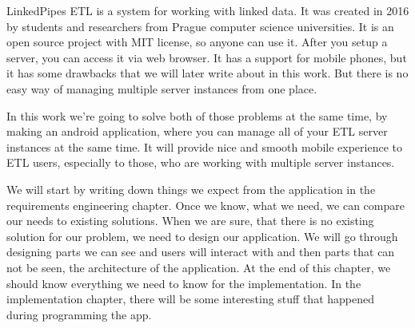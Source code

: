 LinkedPipes ETL is a system for working with linked data.
It was created in 2016 by students and researchers from Prague computer science universities.
It is an open source project with MIT license, so anyone can use it.
After you setup a server, you can access it via web browser.
It has a support for mobile phones, but it has some drawbacks that we will later write about in this work.
But there is no easy way of managing multiple server instances from one place.

In this work we're going to solve both of those problems at the same time, by making an android application, where you can manage all of your ETL server instances at the same time.
It will provide nice and smooth mobile experience to ETL users, especially to those, who are working with multiple server instances.

We will start by writing down things we expect from the application in the requirements engineering chapter.
Once we know, what we need, we can compare our needs to existing solutions.
When we are sure, that there is no existing solution for our problem, we need to design our application.
We will go through designing parts we can see and users will interact with and then parts that can not be seen, the architecture of the application.
At the end of this chapter, we should know everything we need to know for the implementation.
In the implementation chapter, there will be some interesting stuff that happened during programming the app.